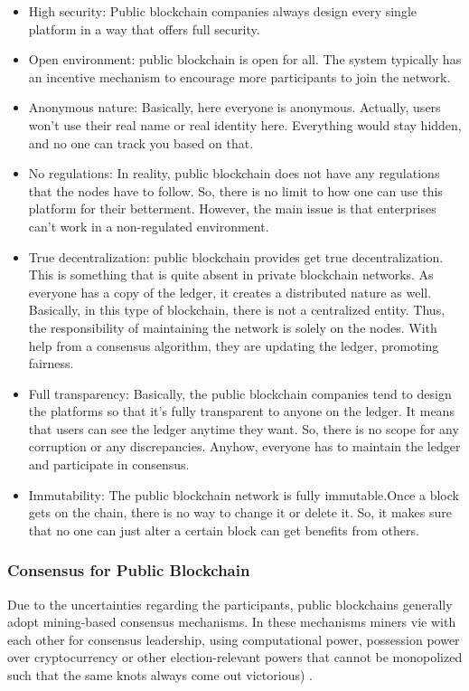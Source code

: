 \begin{itemize}
\item High security: Public blockchain companies always design every single platform in a way that offers full security.
\item Open environment: public blockchain is open for all. The system typically has an incentive mechanism to encourage more participants to join the network.
\item Anonymous nature: Basically, here everyone is anonymous. Actually, users won’t use their real name or real identity here. Everything would stay hidden, and no one can track you based on that.
\item No regulations: In reality, public blockchain does not have any regulations that the nodes have to follow. So, there is no limit to how one can use this platform for their betterment. However, the main issue is that enterprises can’t work in a non-regulated environment.
\item True decentralization: public blockchain provides get true decentralization. This is something that is quite absent in private blockchain networks. As everyone has a copy of the ledger, it creates a distributed nature as well. Basically, in this type of blockchain, there is not a centralized entity. Thus, the responsibility of maintaining the network is solely on the nodes. With help from a consensus algorithm, they are updating the ledger, promoting fairness.
\item Full transparency: Basically, the public blockchain companies tend to design the platforms so that it’s fully transparent to anyone on the ledger. It means that users can see the ledger anytime they want. So, there is no scope for any corruption or any discrepancies. Anyhow, everyone has to maintain the ledger and participate in consensus.
\item Immutability: The public blockchain network is fully immutable.Once a block gets on the chain, there is no way to change it or delete it. So, it makes sure that no one can just alter a certain block can get benefits from others.
\end{itemize}

\subsubsection{Consensus for Public Blockchain}\label{sec:consensoPublica}
Due to the uncertainties regarding the participants, public blockchains generally adopt mining-based consensus mechanisms. In these mechanisms miners vie with each other for consensus leadership, using computational power, possession power over cryptocurrency or other election-relevant powers that cannot be monopolized such that the same knots always come out victorious) \cite{greve2018blockchain}.

